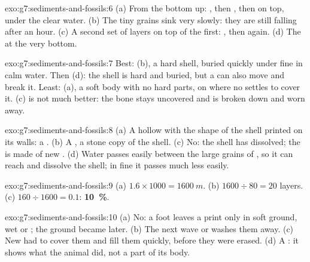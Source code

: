 \begin{solution}{exo:g7:sediments-and-fossils:6}
(a) From the bottom up: , then , then  on top, under the
clear water. (b) The tiny  grains sink very slowly: they are still
falling after an hour. (c) A second set of layers on top of the first:
, then  again. (d) The  at the very bottom.
\end{solution}

\begin{solution}{exo:g7:sediments-and-fossils:7}
Best: (b), a hard shell, buried quickly under fine  in calm water.
Then (d): the shell is hard and buried, but a  can also move and
break it. Least: (a), a soft body with no hard parts, on  where no
 settles to cover it. (c) is not much better: the bone stays
uncovered and is broken down and worn away.
\end{solution}

\begin{solution}{exo:g7:sediments-and-fossils:8}
(a) A hollow with the shape of the shell printed on its walls: a .
(b) A , a stone copy of the shell. (c) No: the shell has dissolved;
the  is made of new . (d) Water passes easily between the
large grains of , so it can reach and dissolve the shell; in fine
 it passes much less easily.
\end{solution}

\begin{solution}{exo:g7:sediments-and-fossils:9}
(a) $1.6 \times 1000 = \qty{1600}{m}$. (b) $1600 \div 80 = 20$ layers.
(c) $160 \div 1600 = 0.1$: \textbf{10~\%}.
\end{solution}

\begin{solution}{exo:g7:sediments-and-fossils:10}
(a) No: a foot leaves a print only in soft ground, wet  or ; the
ground became  later. (b) The next wave or  washes them away.
(c) New  had to cover them and fill them quickly, before they
were erased. (d) A : it shows what the animal did, not a
part of its body.
\end{solution}

